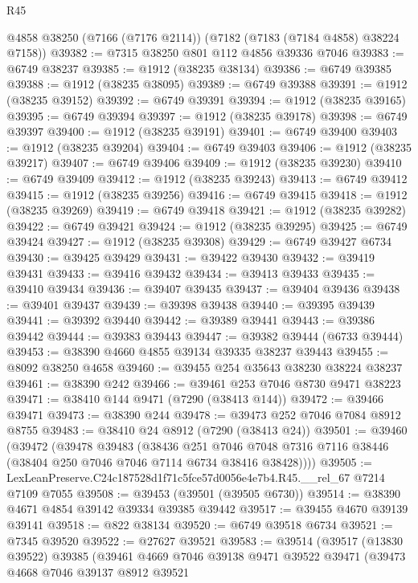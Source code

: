 \begin{lexlean}{R45}
\begin{coremodule}
{    @4858
    @38250
    (@7166 (@7176 @2114))
    (@7182 (@7183 (@7184 @4858) @38224 @7158))
@39382 := @7315 @38250 @801 @112 @4856 @39336 @7046
@39383 := @6749 @38237
@39385 := @1912 (@38235 @38134)
@39386 := @6749 @39385
@39388 := @1912 (@38235 @38095)
@39389 := @6749 @39388
@39391 := @1912 (@38235 @39152)
@39392 := @6749 @39391
@39394 := @1912 (@38235 @39165)
@39395 := @6749 @39394
@39397 := @1912 (@38235 @39178)
@39398 := @6749 @39397
@39400 := @1912 (@38235 @39191)
@39401 := @6749 @39400
@39403 := @1912 (@38235 @39204)
@39404 := @6749 @39403
@39406 := @1912 (@38235 @39217)
@39407 := @6749 @39406
@39409 := @1912 (@38235 @39230)
@39410 := @6749 @39409
@39412 := @1912 (@38235 @39243)
@39413 := @6749 @39412
@39415 := @1912 (@38235 @39256)
@39416 := @6749 @39415
@39418 := @1912 (@38235 @39269)
@39419 := @6749 @39418
@39421 := @1912 (@38235 @39282)
@39422 := @6749 @39421
@39424 := @1912 (@38235 @39295)
@39425 := @6749 @39424
@39427 := @1912 (@38235 @39308)
@39429 := @6749 @39427 @6734
@39430 := @39425 @39429
@39431 := @39422 @39430
@39432 := @39419 @39431
@39433 := @39416 @39432
@39434 := @39413 @39433
@39435 := @39410 @39434
@39436 := @39407 @39435
@39437 := @39404 @39436
@39438 := @39401 @39437
@39439 := @39398 @39438
@39440 := @39395 @39439
@39441 := @39392 @39440
@39442 := @39389 @39441
@39443 := @39386 @39442
@39444 := @39383 @39443
@39447 := @39382 @39444 (@6733 @39444)
@39453 := @38390 @4660 @4855 @39134 @39335 @38237 @39443
@39455 := @8092 @38250 @4658
@39460 := @39455 @254 @35643 @38230 @38224 @38237
@39461 := @38390 @242
@39466 := @39461 @253 @7046 @8730 @9471 @38223
@39471 := @38410 @144 @9471 (@7290 (@38413 @144))
@39472 := @39466 @39471
@39473 := @38390 @244
@39478 := @39473 @252 @7046 @7084 @8912 @8755
@39483 := @38410 @24 @8912 (@7290 (@38413 @24))
@39501 := @39460
    (@39472
      (@39478
        @39483
        (@38436
          @251
          @7046
          @7048
          @7316
          @7116
          @38446
          (@38404 @250 @7046 @7046 @7114 @6734 @38416 @38428))))
@39505 := LexLeanPreserve.C24c187528d1f71c5fce57d0056e4e7b4.R45.__rel_67 @7214 @7109 @7055
@39508 := @39453 (@39501 (@39505 @6730))
@39514 := @38390 @4671 @4854 @39142 @39334 @39385 @39442
@39517 := @39455 @4670 @39139 @39141
@39518 := @822 @38134
@39520 := @6749 @39518 @6734
@39521 := @7345 @39520
@39522 := @27627 @39521
@39583 := @39514
    (@39517
      (@13830 @39522)
      @39385
      (@39461
        @4669
        @7046
        @39138
        @9471
        @39522
        @39471
        (@39473
          @4668
          @7046
          @39137
          @8912
          @39521
}
\end{coremodule}
\end{lexlean}
